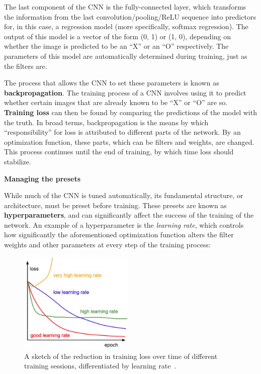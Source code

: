\documentclass[a4paper, 11pt]{article} %
\begin{document}
	The last component of the CNN is the fully-connected layer, which transforms the information from 
	the last convolution/pooling/ReLU sequence into predictors for, in this case, a regression model 
	(more specifically, softmax regression). The output of this model is a vector of the form (0, 1) or (1, 
	0), depending on whether the image is predicted to be an ``X'' or an ``O'' respectively. The 
	parameters of this model are automatically determined during training, just as the filters are. 
	
	The process that allows the CNN to set these parameters is known as \textbf{backpropagation}. The 
	training process of a CNN involves using it to predict whether certain images that are already known 
	to be  ``X'' or ``O'' are so.  \textbf{Training loss} can then be found by comparing the predictions of 
	the model with the truth. In broad terms, backpropagation is the means by which ``responsibility'' 
	for loss is attributed to different parts of the network. By an optimization function, these parts, 
	which can be filters and weights, are changed. This process continues until the end of training, by 
	which time loss should stabilize.
	
	\hspace*{-6mm}\textbf{Managing the presets}
	
	While much of the CNN is tuned automatically, its fundamental structure, or architecture, must be 
	preset before training. These presets are known as \textbf{hyperparameters}, and can significantly 
	affect the success of the training of the network. An example of a hyperparameter is the 
	\textit{learning rate}, which controls how significantly the aforementioned optimization function 
	alters the filter weights and other parameters at every step of the training process:
	\vskip 5mm
	\begin{figure}[h]
		\centering
		\includegraphics[width=5.5cm]{figures/learning_rates.png}
		\caption{A sketch of the reduction in training loss over time of different training 
			sessions, differentiated by learning rate~\cite{learning-rates}\relax.}
	\end{figure}
	
\end{document}
